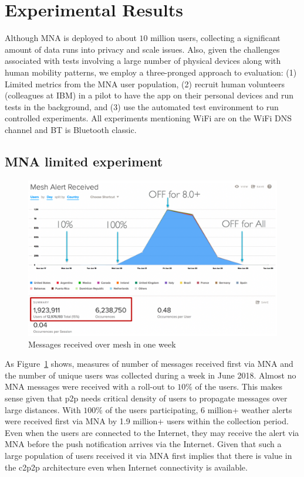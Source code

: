 \documentclass[conference]{IEEEtran}
\begin{document}
%
\section{Experimental Results}
\label{sec:eval}
%
Although MNA is deployed to about $10$ million users, collecting a
significant amount of data runs into privacy and scale issues. Also,
given the challenges associated with tests involving a large number of
physical devices along with human mobility patterns, we employ a
three-pronged approach to evaluation: (1) Limited metrics from the MNA
user population, (2) recruit human volunteers (colleagues at IBM) in a
pilot to have the app on their personal devices and run tests in the
background, and (3) use the automated test environment to run
controlled experiments. All experiments mentioning WiFi are on the
WiFi DNS channel and BT is Bluetooth classic.
%
\subsection{MNA limited experiment}
\label{sec:mna}
%
\begin{figure}[htbp]
\centerline{\includegraphics[width=\columnwidth]{figs/mna}}
\caption{Messages received over mesh in one week}
\label{fig:mna}
\end{figure}
%
As Figure~\ref{fig:mna} shows, measures of number of messages received
first via MNA and the number of unique users was collected during a week in
June 2018. Almost no MNA messages were received with a roll-out to
$10\%$ of the users.  This makes sense given that p2p needs critical
density of users to propagate messages over large distances.  With
$100\%$ of the users participating, 6 million+ weather alerts were
received first via MNA by 1.9 million+ users within the collection
period. Even when the users are connected to the Internet, they
may receive the alert via MNA before the push notification arrives via
the Internet. Given that such a large population of users received it
via MNA first implies that there is value in the c2p2p architecture
even when Internet connectivity is available.
%
\end{document}
